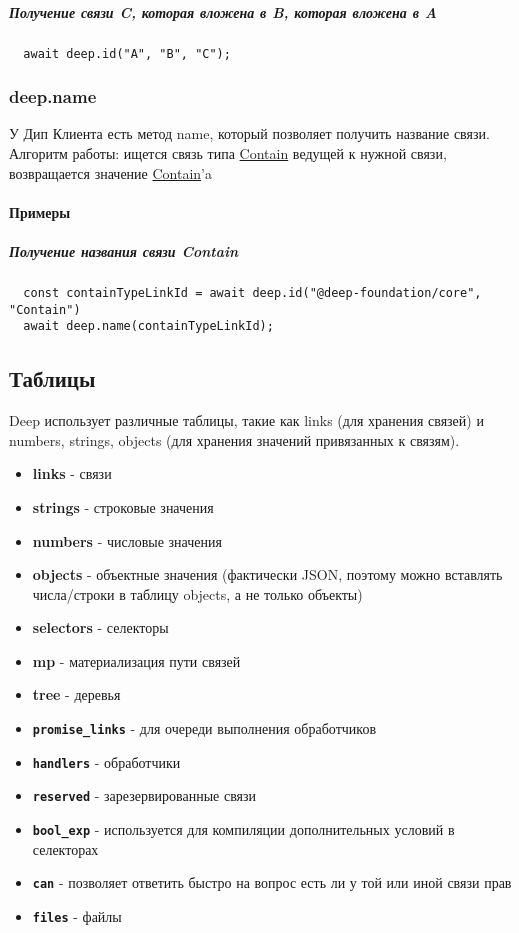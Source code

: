\documentclass{article}
\begin{document}
\subparagraph{Получение связи C, которая вложена в B, которая вложена в A}
\begin{lstlisting}
  await deep.id("A", "B", "C");
\end{lstlisting}
\subsubsection{deep.name}
У Дип Клиента есть метод name, который позволяет получить название связи. \\
Алгоритм работы: ищется связь типа
\hyperlink{Core.Contain.Description}{Contain} ведущей к нужной связи,
возвращается значение \hyperlink{Core.Contain.Description}{Contain}'a
\paragraph{Примеры}
\subparagraph{Получение названия связи Contain}
\begin{lstlisting}
  const containTypeLinkId = await deep.id("@deep-foundation/core", "Contain")
  await deep.name(containTypeLinkId);
\end{lstlisting}
\subsection{Таблицы}
Deep использует различные таблицы, такие как links (для хранения связей) и
numbers, strings, objects (для хранения значений привязанных к связям).

\begin{itemize}
      \item \textbf{links} - связи
      \item \textbf{strings} - строковые значения
      \item \textbf{numbers} - числовые значения
      \item \textbf{objects} - объектные значения (фактически JSON, поэтому
            можно
            вставлять числа/строки в таблицу objects, а не только объекты)
      \item \textbf{selectors} - селекторы
      \item \textbf{mp} - материализация пути связей
      \item \textbf{tree} - деревья
      \item \textbf{\texttt{promise\_links}} - для очереди выполнения
            обработчиков
      \item \textbf{\texttt{handlers}} - обработчики
      \item \textbf{\texttt{reserved}} - зарезервированные связи
      \item \textbf{\texttt{bool\_exp}} - используется для компиляции
            дополнительных условий в селекторах
      \item \textbf{\texttt{can}} - позволяет ответить быстро на вопрос есть ли
            у
            той или иной связи прав
      \item \textbf{\texttt{files}} - файлы
\end{itemize}
\end{document}
